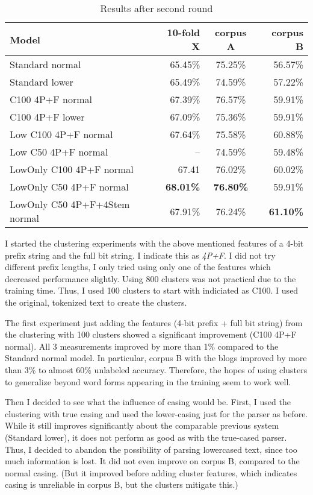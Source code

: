 \documentclass[11pt,letterpaper, covington]{article}
\begin{document}
\begin{table}
\center
  \begin{tabular}{ | l || r | c | r | }
    \hline
   \textbf{Model} & \textbf{10-fold X} & \textbf{corpus A} & \textbf{corpus B}  \\ \hline
    Standard normal & 65.45\% & 75.25\% & 56.57\% \\ 
    Standard lower & 65.49\% & 74.59\% & 57.22\% \\
    C100 4P+F normal & 67.39\% & 76.57\% & 59.91\% \\
    C100 4P+F lower & 67.09\% & 75.36\% & 59.91\% \\
    Low C100 4P+F normal & 67.64\% & 75.58\% & 60.88\% \\
    Low C50 4P+F normal & -- & 74.59\%  & 59.48\% \\
    LowOnly C100 4P+F normal & 67.41 & 76.02\%  & 60.02\% \\
    LowOnly C50 4P+F normal & \textbf{68.01\%}& \textbf{76.80\%} & 59.91\% \\
    LowOnly C50 4P+F+4Stem normal & 67.91\% & 76.24\% & \textbf{61.10\%} \\ \hline
  \end{tabular}
\caption{Results after second round}
\label{tab:rnd2}
\end{table}

I started the clustering experiments with the above mentioned features of a 4-bit prefix string and the full bit string. I indicate this as \emph{4P+F}. I did not try different prefix lengths, I only tried using only one of the features which decreased performance slightly. Using 800 clusters was not practical due to the training time. Thus, I used 100 clusters to start with indiciated as C100. I used the original, tokenized text to create the clusters.

The first experiment just adding the features (4-bit prefix + full bit string) from the clustering with 100 clusters showed a significant improvement (C100 4P+F normal). All 3 measurements improved by more than 1\% compared to the Standard normal model. In particular, corpus B with the blogs improved by more than 3\% to almost 60\% unlabeled accuracy. Therefore, the hopes of using clusters to generalize beyond word forms appearing in the training seem to work well. 

Then I decided to see what the influence of casing would be. First, I used the clustering with true casing and used the lower-casing just for the parser as before. While it still improves significantly about the comparable previous system (Standard lower), it does not perform as good as with the true-cased parser. Thus, I decided to abandon the possibility of parsing lowercased text, since too much information is lost. It did not even improve on corpus B, compared to the normal casing. (But it improved before adding cluster features, which indicates casing is unreliable in corpus B, but the clusters mitigate this.)
 
\end{document}
